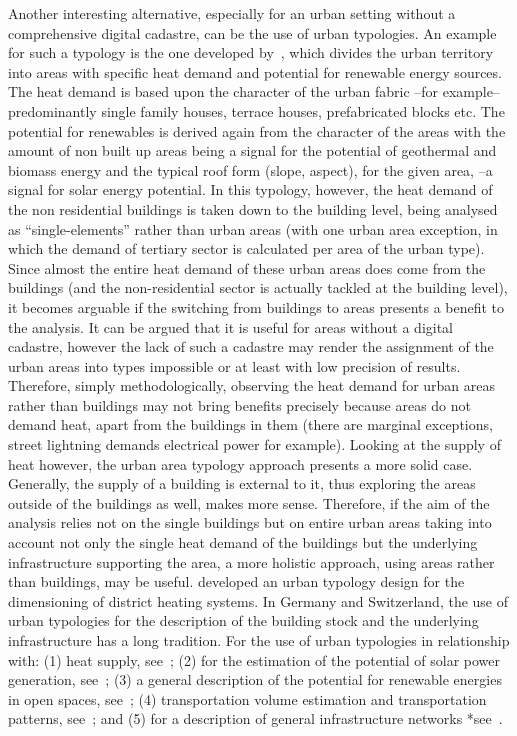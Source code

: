 \documentclass[authoryear,preprint,review,12pt]{elsarticle}
\begin{document}
\begin{linenumbers}
Another interesting alternative, especially for an urban setting without a
comprehensive digital cadastre, can be the use of urban typologies.
An example for such a typology is the one developed by~\cite{Hegger.2014}, which
divides the urban territory into areas with specific heat demand and potential
for renewable energy sources. The heat demand is based upon the character of
the urban fabric --for example-- predominantly single family houses, terrace
houses, prefabricated blocks etc. The potential for renewables is derived again
from the character of the areas with the amount of non built up areas being a
signal for the potential of geothermal and biomass energy and the typical roof
form (slope, aspect), for the given area, --a signal for solar energy
potential. In this typology, however, the heat demand of the non residential
buildings is taken down to the building level, being analysed as ``single-elements''
rather than urban areas (with one urban area exception, in which the demand of
tertiary sector is calculated per area of the urban type). Since almost the
entire heat demand of these urban areas does come from the buildings (and the
non-residential sector is actually tackled at the building level), it becomes
arguable if the switching from buildings to areas presents a benefit to the
analysis. It can be argued that it is useful for areas without a digital
cadastre, however the lack of such a cadastre may render the assignment of the
urban areas into types impossible or at least with low precision of results.
Therefore, simply methodologically, observing the heat demand for urban areas
rather than buildings may not bring benefits precisely because areas do not
demand heat, apart from the buildings in them (there are marginal exceptions,
street lightning demands electrical power for example). Looking at the supply
of heat however, the urban area typology approach presents a more solid case.
Generally, the supply of a building is external to it, thus exploring the areas
outside of the buildings as well, makes more sense. Therefore,
%
if the aim of the analysis relies not on the single buildings but on entire
urban areas taking into account not only the single heat demand of the
buildings but the underlying infrastructure supporting the area, a more
holistic approach, using areas rather than buildings, may be useful. \citet{Roth.1980}
developed an urban typology design for the dimensioning of
district heating systems. In Germany and Switzerland, the use of urban
typologies for the description of the building stock and the underlying
infrastructure has a long tradition.
For the use of
urban typologies in relationship with: (1) heat supply, see~\cite{Roth.1980,
Sieverts.1980, Blesl.2002, Jentsch.2008}; (2) for the estimation of the
potential of solar power generation, see~\cite{Everding.2004}; (3) a general
description of the potential for renewable energies in open spaces,
see~\cite{Genske.2009}; (4) transportation volume estimation and transportation
patterns, see~\cite{Marconi.2006, Krug.2006}; and (5) for a description of
general infrastructure networks *see~\cite{Buchert.2004, Ecoplan.2000,
Einig.2006, Erhorn.2011}.\\


\end{linenumbers}
\end{document}
